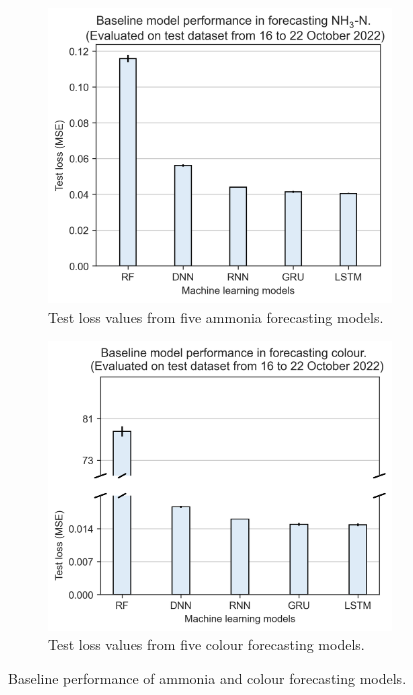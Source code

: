\begin{figure}[h]
    \centering
    \begin{subfigure}[t]{0.45\textwidth}
      \includegraphics[width=\linewidth]{imgs/results/baseline-models-nh3.png}
      \caption{Test loss values from five ammonia forecasting models.} \label{fig:baseline-nh3}
    \end{subfigure}%
    \hspace{2em}%
    \begin{subfigure}[t]{0.45\textwidth}
      \includegraphics[width=\linewidth]{imgs/results/baseline-models-colour.png}
      \caption{Test loss values from five colour forecasting models.} \label{fig:baseline-colour}
    \end{subfigure}%
  \caption{Baseline performance of ammonia and colour forecasting models.} \label{fig:baseline-performance}
\end{figure}


